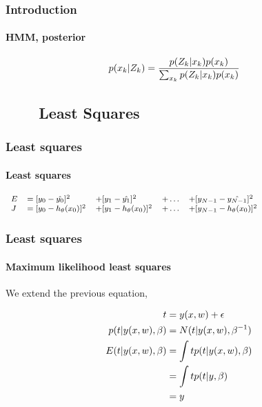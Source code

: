 \begin{frame}
\frametitle{Introduction}
\framesubtitle{HMM, posterior}
\logoCSIPCPL\mypagenum
	\begin{align*}
		p(x_k| Z_k) &=    \frac{p(Z_k| x_k) p(x_k)}{\sum_{x_k} p(Z_k| x_k) p(x_k)}
	\end{align*}	
\end{frame}


\subsection{\ \ \ \ Least Squares}
\begin{frame}
\frametitle{Least squares}
\framesubtitle{Least squares}
\logoCSIPCPL\mypagenum
	$\mbox{\fontsize{8}{10}\selectfont$
		\begin{array}{lllll}
					E 	&= 	[y_0-\hat{y_0}]^2 & +	[y_1-\hat{y_1}]^2 &	 + \ldots & + [y_{N-1}-\hat{y_{N-1}}]^2 \\
		J 	&= 	[y_0-h_\theta(x_0)]^2 & +	[y_1-h_\theta(x_0)]^2 &	 + \ldots & + [y_{N-1}-h_\theta(x_0)]^2
		\end{array}
	$}$
\end{frame}


\begin{frame}
\frametitle{Least squares}
\framesubtitle{Maximum likelihood least squares}
\logoCSIPCPL\mypagenum
	We extend the previous equation,

			
	\begin{align}
	t&=y(x,w)+\epsilon \notag\\
	p(t|y(x,w),\beta)&=N(t|y(x,w),\beta^{-1})\notag\\
	E(t|y(x,w),\beta)&=\int{tp(t|y(x,w),\beta)}\\
	&=\int{tp(t|y,\beta)}\notag\\
	&=y\notag
	\end{align}
\end{frame}










